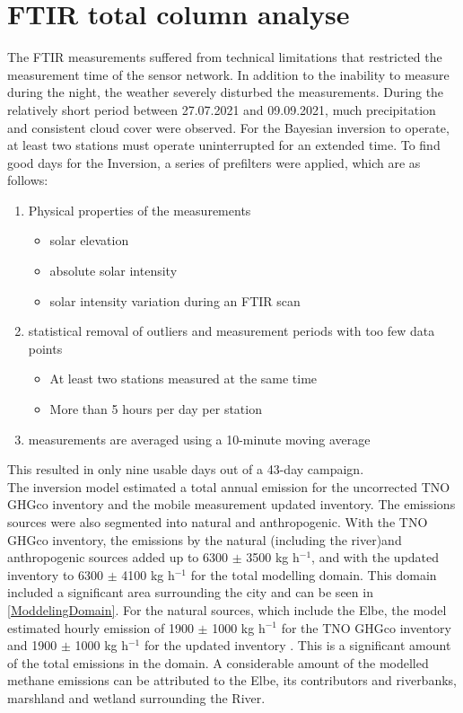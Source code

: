 \section{FTIR total column analyse}
The FTIR measurements suffered from technical limitations that restricted the measurement time of the sensor network. In addition to the inability to measure during the night, the weather severely disturbed the measurements. During the relatively short period between 27.07.2021 and 09.09.2021, much precipitation and consistent cloud cover were observed. For the Bayesian inversion to operate, at least two stations must operate uninterrupted for an extended time. To find good days for the Inversion, a series of prefilters were applied, which are as follows:
\begin{enumerate}
  \item Physical properties of the measurements
  \begin{itemize}
    \item solar elevation
    \item absolute solar intensity
    \item solar intensity variation during an FTIR scan
  \end{itemize}
  \item statistical removal of outliers and measurement periods with too few data points
    \begin{itemize}
     \item At least two stations measured at the same time
     \item More than 5 hours per day per station
  \end{itemize}
  \item measurements are averaged using a 10-minute moving average
\end{enumerate}
This resulted in only nine usable days out of a 43-day campaign. \\
The inversion model estimated a total annual emission for the uncorrected TNO GHGco inventory and the mobile measurement updated inventory. The emissions sources were also segmented into natural and anthropogenic. With the TNO GHGco inventory, the emissions by the natural (including the river)and anthropogenic sources added up to  6300 $\pm$ 3500 kg h$^{-1}$, and with the updated inventory to 6300 $\pm$ 4100 kg h$^{-1}$ for the total modelling domain. This domain included a significant area surrounding the city and can be seen in \cref{ModdelingDomain}. For the natural sources, which include the Elbe, the model estimated hourly emission of 1900 $\pm$ 1000  kg h$^{-1}$ for the TNO GHGco inventory and 1900 $\pm$ 1000  kg h$^{-1}$ for the updated inventory \cite{Forstmaier.2023}. This is a significant amount of the total emissions in the domain. A considerable amount of the modelled methane emissions can be attributed to the Elbe, its contributors and riverbanks, marshland and wetland surrounding the River.

